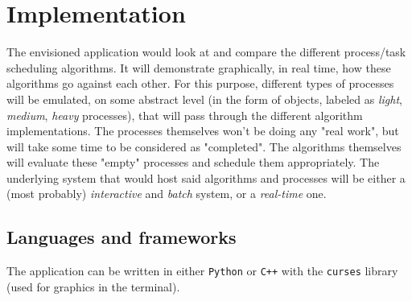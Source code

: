 \documentclass{article}
\newcommand{\code}[1]{\colorbox{codegray}{\texttt{#1}}}
\begin{document}
\section*{Implementation}

The envisioned application would look at and compare the different process/task scheduling algorithms. It will demonstrate graphically, in real time, how these algorithms go against each other. For this purpose, different types of processes will be emulated, on some abstract level (in the form of objects, labeled as \textit{light}, \textit{medium}, \textit{heavy} processes), that will pass through the different algorithm implementations. The processes themselves won't be doing any "real work", but will take some time to be considered as "completed". The algorithms themselves will evaluate these "empty" processes and schedule them appropriately. The underlying system that would host said algorithms and processes will be either a (most probably) \textit{interactive} and \textit{batch} system, or a \textit{real-time} one.

\subsection*{Languages and frameworks}

The application can be written in either \code{Python} or \code{C++} with the \code{curses} library (used for graphics in the terminal).
\end{document}
